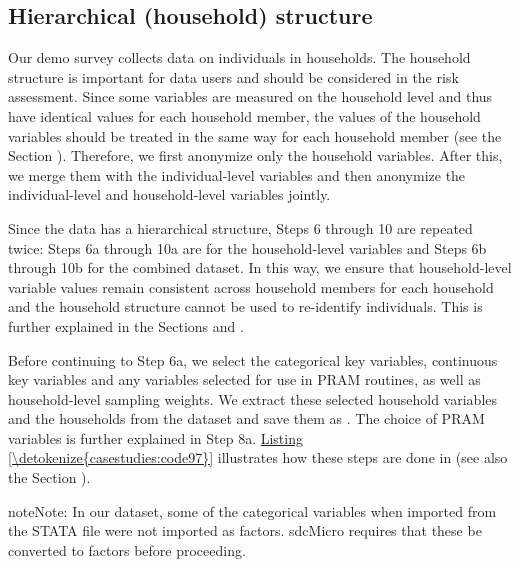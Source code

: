 \documentclass[letterpaper,10pt,english]{sphinxmanual}
\begin{document}
\subsection{Hierarchical (household) structure}
\label{\detokenize{casestudies:hierarchical-household-structure}}
Our demo survey collects data on individuals in households. The
household structure is important for data users and should be considered
in the risk assessment. Since some variables are measured on the
household level and thus have identical values for each household
member, the values of the household variables should be treated in the
same way for each household member (see the Section
).
Therefore, we
first anonymize only the household variables. After this, we merge them
with the individual-level variables and then anonymize the
individual-level and household-level variables jointly.

Since the data has a hierarchical structure, Steps 6 through 10 are
repeated twice: Steps 6a through 10a are for the household-level
variables and Steps 6b through 10b for the combined dataset. In this
way, we ensure that household-level variable values remain consistent
across household members for each household and the household structure
cannot be used to re-identify individuals. This is further explained in
the Sections 
and  .

Before continuing to Step 6a, we select the categorical key variables,
continuous key variables and any variables selected for use in PRAM
routines, as well as household-level sampling weights. We extract these
selected household variables and the households from the dataset and
save them as . The choice of PRAM variables is further explained
in Step 8a. \hyperref[\detokenize{casestudies:code97}]{Listing \ref{\detokenize{casestudies:code97}}} illustrates how these steps are done in  (see
also the Section ).

\begin{sphinxadmonition}{note}{Note:}
In our dataset, some of the categorical variables when imported from the STATA file were not imported as
factors. sdcMicro requires that these be converted to factors before
proceeding.
\end{sphinxadmonition}
\end{document}

